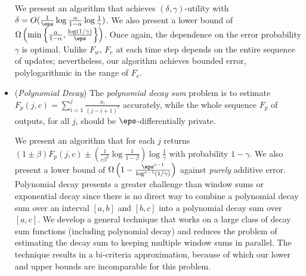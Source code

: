 \begin{itemize}
\smallskip
  We present an algorithm that achieves $(\delta, \gamma)$-utility
  with   $\delta = O(\frac{1}{\eps}\log \frac{\alpha}{1-\alpha} \log
  \frac{1}{\gamma})$.  We also  present a lower bound of
  $\Omega\left(\min\left\{\frac{\alpha}{1-\alpha}, \frac{\log
        (1/\gamma)}{\eps}\right\}\right)$. Once again, the dependence
  on the error probability $\gamma$ is optimal. Unlike $F_w$, $F_e$ at each time step
  depends on the entire sequence of updates; nevertheless, our
  algorithm achieves bounded error, polylogarithmic in the range of $F_e$.

\smallskip
\item ({\em Polynomial Decay}) The \emph{polynomial decay sum} problem
  is to estimate $ F_p(j, c) = \sum_{i = 1}^j{\frac{x_i}{(j-i+1)^c}}$
  accurately, while the whole sequence $F_p$ of outputs, for all $j$,
  should be $\eps$-differentially private.

\smallskip
  We present an algorithm that for each $j$ returns $(1\pm\beta) F_p(j,c) \pm
  \left(\frac{1}{c\beta^2}\log\frac{1}{1-\beta}\right)\log
  \frac{1}{\gamma}$ with probability $1-\gamma$. We also present a lower
  bound of $\Omega\left(1 - \frac{\eps^{c-1}}{\log^{c-1}
      (1/\gamma)}\right)$ against {\em purely} additive error. Polynomial decay presents a greater challenge than window sums or exponential decay since there is no direct way to combine a polynomial decay sum over an
interval $[a, b]$ and 
$[b, c]$ into a polynomial decay sum over $[a, c]$. We develop a general technique that works on a large class of decay sum functions (including polynomial decay) and reduces the problem of estimating the decay sum to keeping multiple window sums in parallel. The technique results in a bi-criteria approximation, because of which our lower and upper bounds are incomparable for this problem. 
      
\end{itemize}

